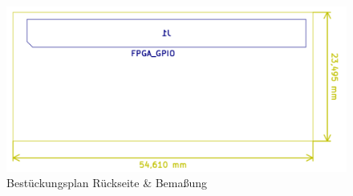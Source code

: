 \begin{figure}[h!]
\begin{center}
\includegraphics[width = 15cm]{SAUER/Grafiken/Prot1/BFAB.png}
\caption{Bestückungsplan Rückseite \& Bemaßung}
\label{Prot1_BFAB}
\end{center}
\end{figure}